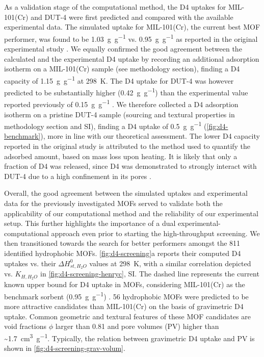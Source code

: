 As a validation stage of the computational method, the D4 uptakes for
MIL-101(Cr) and DUT-4 were first predicted and compared with the available
experimental data. The simulated uptake for MIL-101(Cr), the current best MOF
performer, was found to be \SI{1.03}{\gram\per\gram} vs.
\SI{0.95}{\gram\per\gram} as reported in the original experimental study
\citep{gargiuloChromiumbasedMIL101Metal2019}. We equally confirmed the good
agreement between the calculated and the experimental D4 uptake by recording an
additional adsorption isotherm on a MIL-101(Cr) sample (see methodology
section), finding a D4 capacity of \SI{1.15}{\gram\per\gram} at
\SI{298}{\kelvin}. The D4 uptake for DUT-4 was however predicted to be
substantially higher (\SI{0.42}{\gram\per\gram}) than the experimental value
reported previously of \SI{0.15}{\gram\per\gram}
\citep{mito-okaSiloxaneD4Capture2013}. We therefore collected a D4 adsorption
isotherm on a pristine DUT-4 sample (sourcing and textural properties in
methodology section and SI), finding a D4 uptake of \SI{0.5}{\gram\per\gram}
(\cref{fig:d4-benchmark}), more in line with our theoretical assessment. The
lower D4 capacity reported in the original study is attributed to the method
used to quantify the adsorbed amount, based on mass loss upon heating. It is
likely that only a fraction of D4 was released, since D4 was demonstrated to
strongly interact with DUT-4 due to a high confinement in its pores
\citep{mito-okaSiloxaneD4Capture2013}.

Overall, the good agreement between the simulated uptakes and experimental data
for the previously investigated MOFs served to validate both the applicability
of our computational method and the reliability of our experimental setup. This
further highlights the importance of a dual experimental-computational approach
even prior to starting the high-throughput screening. We then transitioned
towards the search for better performers amongst the 811 identified hydrophobic
MOFs. \cref{fig:d4-screening}a reports their computed D4 uptakes vs. their
\(\Delta H_{st,H_{2}O}^{0}\) values at \SI{298}{\kelvin}, with a similar
correlation depicted vs. \(K_{H,H_{2}O}\) in \cref{fig:d4-screening-henryc}, SI.
The dashed line represents the current known upper bound for D4 uptake in MOFs,
considering MIL-101(Cr) as the benchmark sorbent (\SI{0.95}{\gram\per\gram})
\citep{gargiuloChromiumbasedMIL101Metal2019}. 56 hydrophobic MOFs were predicted
to be more attractive candidates than MIL-101(Cr) on the basis of gravimetric D4
uptake. Common geometric and textural features of these MOF candidates are void
fractions \(\phi\) larger than 0.81 and pore volumes (PV) higher than
\textasciitilde \SI{1.7}{\centi\metre\cubed\per\gram}. Typically, the relation
between gravimetric D4 uptake and PV is shown in
\cref{fig:d4-screening-grav-volum}.

